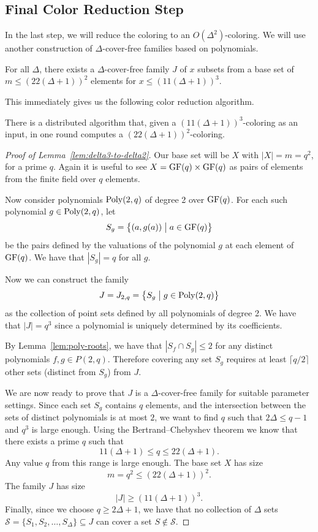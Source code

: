 \subsection{Final Color Reduction Step} \label{ssec:final-step}

In the last step, we will reduce the coloring to an $O(\Delta^2)$-coloring. We will use another construction of $\Delta$-cover-free families based on polynomials.

\begin{lemma} \label{lem:delta3-to-delta2}
  For all $\Delta$, there exists a $\Delta$-cover-free family $J$ of $x$ subsets from a base set of $m \le (22(\Delta+1))^2$ elements for $x \leq (11(\Delta+1))^3$.
\end{lemma}

This immediately gives us the following color reduction algorithm.

\begin{corollary}
  There is a distributed algorithm that, given a $(11(\Delta+1))^3$-coloring as an input, in one round computes a $(22(\Delta+1))^2$-coloring.
\end{corollary}

\begin{proof}[Proof of Lemma~\ref{lem:delta3-to-delta2}]
  Our base set will be $X$ with $|X| = m = q^2$, for a prime $q$. Again it is useful to see $X = \operatorname{GF}(q) \times \operatorname{GF}(q)$ as pairs of elements from the finite field over $q$ elements.
  
  Now consider polynomials $\operatorname{Poly}(2,q)$ of degree 2 over $\operatorname{GF}(q)$. For each such polynomial $g \in \operatorname{Poly}(2,q)$, let 
  \[
    S_g = \bigl\{ (a, g(a)) \bigm| a \in \operatorname{GF}(q) \bigr\}
  \]
  be the pairs defined by the valuations of the polynomial $g$ at each element of $\operatorname{GF}(q)$. We have that $|S_g| = q$ for all $g$.
  
  Now we can construct the family \[J = J_{2,q} = \bigl\{ S_g \bigm| g \in \operatorname{Poly}(2,q) \bigr\}\] as the collection of point sets defined by all polynomials of degree 2. We have that $|J| = q^3$ since a polynomial is uniquely determined by its coefficients.
  
  By Lemma~\ref{lem:poly-roots}, we have that $|S_f \cap S_g| \leq 2$ for any distinct polynomials $f,g \in P(2,q)$. Therefore covering any set $S_g$ requires at least $\lceil q/2 \rceil$ other sets (distinct from $S_g$) from $J$.
  
  We are now ready to prove that $J$ is a $\Delta$-cover-free family for suitable parameter settings. Since each set $S_g$ contains $q$ elements, and the intersection between the sets of distinct polynomials is at most $2$, we want to find $q$ such that $2\Delta \leq q - 1$ and $q^3$ is large enough. Using the Bertrand--Chebyshev theorem we know that there exists a prime $q$ such that
  \[
    11(\Delta + 1) \leq q \leq 22(\Delta + 1).
  \]
  Any value $q$ from this range is large enough. The base set $X$ has size 
  \[
  m = q^2 \leq (22(\Delta + 1))^2.
  \]
  The family $J$ has size
  \[
    |J| \geq (11(\Delta + 1))^3.
  \]
  Finally, since we choose $q \geq 2\Delta + 1$, we have that no collection of $\Delta$ sets $\mathcal{S} = \{ S_1, S_2, \dots, S_{\Delta} \} \subseteq J$ can cover a set $S \notin \mathcal{S}$.
\end{proof}

